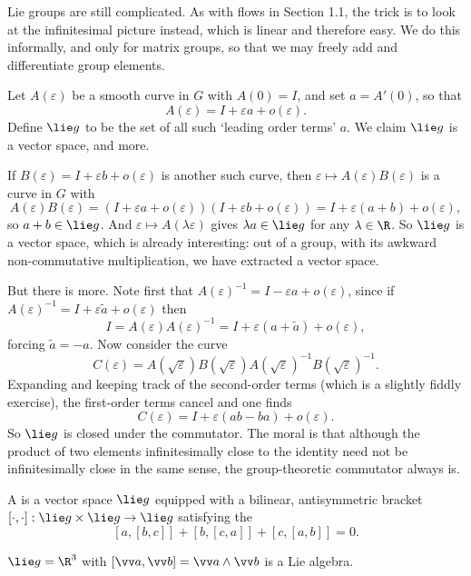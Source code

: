 Lie groups are still complicated. As with flows in Section 1.1, the trick is to look at the infinitesimal picture instead, which is linear and therefore easy. We do this informally, and only for matrix groups, so that we may freely add and differentiate group elements.

Let $A(\varepsilon)$ be a smooth curve in $G$ with $A(0) = I$, and set $a = A'(0)$, so that
$$
A(\varepsilon) = I + \varepsilon a + o(\varepsilon).
$$
Define $\lie g$ to be the set of all such `leading order terms' $a$. We claim $\lie g$ is a vector space, and more.

If $B(\varepsilon) = I + \varepsilon b + o(\varepsilon)$ is another such curve, then $\varepsilon\mapsto A(\varepsilon)B(\varepsilon)$ is a curve in $G$ with
$$
A(\varepsilon)B(\varepsilon) = \left(I+\varepsilon a + o(\varepsilon)\right)\left(I + \varepsilon b + o(\varepsilon)\right) = I + \varepsilon(a+b) + o(\varepsilon),
$$
so $a + b\in\lie g$. And $\varepsilon\mapsto A(\lambda\varepsilon)$ gives $\lambda a\in\lie g$ for any $\lambda\in\R$. So $\lie g$ is a vector space, which is already interesting: out of a group, with its awkward non-commutative multiplication, we have extracted a vector space.

But there is more. Note first that $A(\varepsilon)^{-1} = I - \varepsilon a + o(\varepsilon)$, since if $A(\varepsilon)^{-1} = I + \varepsilon\tilde a + o(\varepsilon)$ then
$$
I = A(\varepsilon)A(\varepsilon)^{-1} = I + \varepsilon(a+\tilde a) + o(\varepsilon),
$$
forcing $\tilde a = -a$. Now consider the curve
$$
C(\varepsilon) = A(\sqrt\varepsilon)B(\sqrt\varepsilon)A(\sqrt\varepsilon)^{-1}B(\sqrt\varepsilon)^{-1}.
$$
Expanding and keeping track of the second-order terms (which is a slightly fiddly exercise), the first-order terms cancel and one finds
$$
C(\varepsilon) = I + \varepsilon(ab - ba) + o(\varepsilon).
$$
So $\lie g$ is closed under the commutator. The moral is that although the product of two elements infinitesimally close to the identity need not be infinitesimally close in the same sense, the group-theoretic commutator always is.

\begin{definition}
	A  is a vector space $\lie g$ equipped with a bilinear, antisymmetric bracket $[\cdot,\cdot] : \lie g\times\lie g\to\lie g$ satisfying the 
	$$
	[a,[b,c]] + [b,[c,a]] + [c,[a,b]] = 0.
	$$
\end{definition}

\begin{example}
	$\lie g = \R^3$ with $[\vv a, \vv b] = \vv a\wedge\vv b$ is a Lie algebra.
\end{example}

